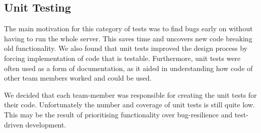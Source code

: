 \subsection{Unit Testing}
The main motivation for this category of tests was to find bugs early on without having to run the whole server. This saves time and uncovers new code breaking old functionality. We also found that unit tests improved the design process by forcing implementation of code that is testable. Furthermore, unit tests were often used as a form of documentation, as it aided in understanding how code of other team members worked and could be used. \par 
We decided that each team-member was responsible for creating the unit tests for their code. Unfortunately the number and coverage of unit tests is still quite low. This may be the result of prioritising functionality over bug-resilience and test-driven development. 